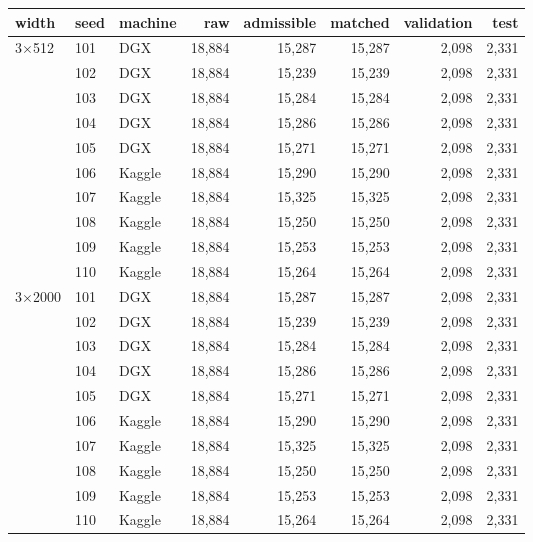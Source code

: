 \begin{tabular}{lllrrrrr}
\toprule
width & seed & machine & raw & admissible & matched & validation & test \\
\midrule
3$\times$512 & 101 & DGX & 18,884 & 15,287 & 15,287 & 2,098 & 2,331 \\
 & 102 & DGX & 18,884 & 15,239 & 15,239 & 2,098 & 2,331 \\
 & 103 & DGX & 18,884 & 15,284 & 15,284 & 2,098 & 2,331 \\
 & 104 & DGX & 18,884 & 15,286 & 15,286 & 2,098 & 2,331 \\
 & 105 & DGX & 18,884 & 15,271 & 15,271 & 2,098 & 2,331 \\
 & 106 & Kaggle & 18,884 & 15,290 & 15,290 & 2,098 & 2,331 \\
 & 107 & Kaggle & 18,884 & 15,325 & 15,325 & 2,098 & 2,331 \\
 & 108 & Kaggle & 18,884 & 15,250 & 15,250 & 2,098 & 2,331 \\
 & 109 & Kaggle & 18,884 & 15,253 & 15,253 & 2,098 & 2,331 \\
 & 110 & Kaggle & 18,884 & 15,264 & 15,264 & 2,098 & 2,331 \\
3$\times$2000 & 101 & DGX & 18,884 & 15,287 & 15,287 & 2,098 & 2,331 \\
 & 102 & DGX & 18,884 & 15,239 & 15,239 & 2,098 & 2,331 \\
 & 103 & DGX & 18,884 & 15,284 & 15,284 & 2,098 & 2,331 \\
 & 104 & DGX & 18,884 & 15,286 & 15,286 & 2,098 & 2,331 \\
 & 105 & DGX & 18,884 & 15,271 & 15,271 & 2,098 & 2,331 \\
 & 106 & Kaggle & 18,884 & 15,290 & 15,290 & 2,098 & 2,331 \\
 & 107 & Kaggle & 18,884 & 15,325 & 15,325 & 2,098 & 2,331 \\
 & 108 & Kaggle & 18,884 & 15,250 & 15,250 & 2,098 & 2,331 \\
 & 109 & Kaggle & 18,884 & 15,253 & 15,253 & 2,098 & 2,331 \\
 & 110 & Kaggle & 18,884 & 15,264 & 15,264 & 2,098 & 2,331 \\
\bottomrule
\end{tabular}
